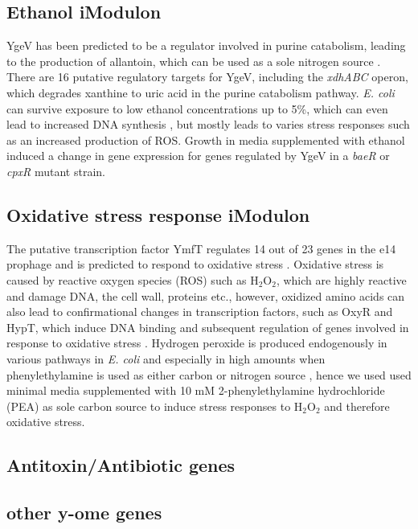\subsection{Ethanol iModulon}
YgeV has been predicted to be a regulator involved in purine catabolism, leading to the production of allantoin, which can be used as a sole nitrogen source \cite{iwadate2019identification}. There are 16 putative regulatory targets \cite{lamoureux2021precise} for YgeV, including the \textit{xdhABC} operon, which degrades xanthine to uric acid \cite{iwadate2019identification} in the purine catabolism pathway. \textit{E. coli} can survive exposure to low ethanol concentrations up to 5\%, which can even lead to increased DNA synthesis \cite{basu1994effect}, but mostly leads to varies stress responses such as an increased production of ROS. Growth in media supplemented with ethanol induced a change in gene expression for genes regulated by YgeV in a \textDelta\textit{baeR} or \textDelta\textit{cpxR} mutant strain. 
\subsection{Oxidative stress response iModulon}
The putative transcription factor YmfT regulates 14 out of 23 genes in the e14 prophage and is predicted to respond to oxidative stress \cite{lamoureux2021precise}. Oxidative stress is caused by reactive oxygen species (ROS) such as $\text{H}_2\text{O}_2$, which are highly reactive and damage DNA, the cell wall, proteins \cite{ezraty2017oxidative} etc., however, oxidized amino acids can also lead to confirmational changes in transcription factors, such as OxyR and HypT, which induce DNA binding and subsequent regulation of genes involved in response to oxidative stress  \cite{ezraty2017oxidative}. Hydrogen peroxide is produced endogenously in various pathways in \textit{E. coli} and especially in high amounts when phenylethylamine is used as either carbon or nitrogen source \cite{ravindra2013escherichia}, hence we used used minimal media supplemented with 10 mM 2-phenylethylamine hydrochloride (PEA) as sole carbon source to induce stress responses to $\text{H}_2\text{O}_2$ and therefore oxidative stress. 
\subsection{Antitoxin/Antibiotic genes}
\subsection{other y-ome genes}
